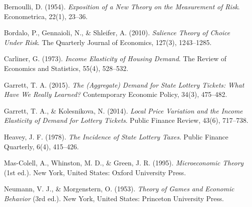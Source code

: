\documentclass[11pt, oneside]{book}
\begin{document}
\begin{thebibliography}{111}







 Bernoulli, D. (1954). \textit{Exposition of a New Theory on the Measurement of Risk}. Econometrica, 22(1), 23–36.

 Bordalo, P., Gennaioli, N., \& Shleifer, A. (2010). \textit{Salience Theory of Choice Under Risk}. The Quarterly Journal of Economics, 127(3), 1243–1285.

 Carliner, G. (1973). \textit{Income Elasticity of Housing Demand}. The Review of Economics and Statistics, 55(4), 528–532.

 Garrett, T. A. (2015). \textit{The (Aggregate) Demand for State Lottery Tickets: What Have We Really Learned?} Contemporary Economic Policy, 34(3), 475–482.

 Garrett, T. A., \& Kolesnikova, N. (2014). \textit{Local Price Variation and the Income Elasticity of Demand for Lottery Tickets}. Public Finance Review, 43(6), 717–738.

 Heavey, J. F. (1978). \textit{The Incidence of State Lottery Taxes}. Public Finance Quarterly, 6(4), 415–426.

 Mas-Colell, A., Whinston, M. D., \& Green, J. R. (1995). \textit{Microeconomic Theory} (1st ed.). New York, United States: Oxford University Press.

 Neumann, V. J., \& Morgenstern, O. (1953). \textit{Theory of Games and Economic Behavior} (3rd ed.). New York, United States: Princeton University Press.


\end{thebibliography}
\end{document}
